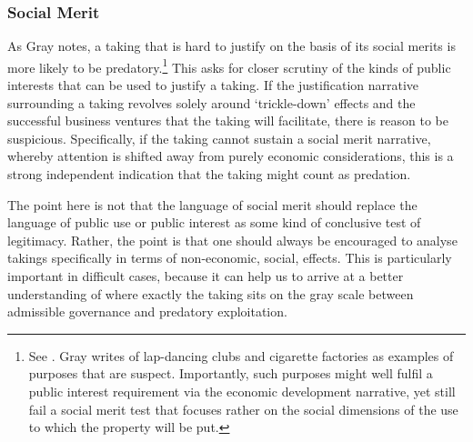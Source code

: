 \subsubsection*{Social Merit}

As Gray notes, a taking that is hard to justify on the basis of its social merits is more likely to be predatory.\footnote{See \cite[34]{gray11}. Gray writes of lap-dancing clubs and cigarette factories as examples of purposes that are suspect. Importantly, such purposes might well fulfil a public interest requirement via the economic development narrative, yet still fail a social merit test that focuses rather on the social dimensions of the use to which the property will be put.} This asks for closer scrutiny of the kinds of public interests that can be used to justify a taking. If the justification narrative surrounding a taking revolves solely around `trickle-down' effects and the successful business ventures that the taking will facilitate, there is reason to be suspicious. Specifically, if the taking cannot sustain a social merit narrative, whereby attention is shifted away from purely economic considerations, this is a strong independent indication that the taking might count as predation.

The point here is not that the language of social merit should replace the language of public use or public interest as some kind of conclusive test of legitimacy. Rather, the point is that one should always be encouraged to analyse takings specifically in terms of non-economic, social, effects. This is particularly important in difficult cases, because it can help us to arrive at a better understanding of where exactly the taking sits on the gray scale between admissible governance and predatory exploitation. 


